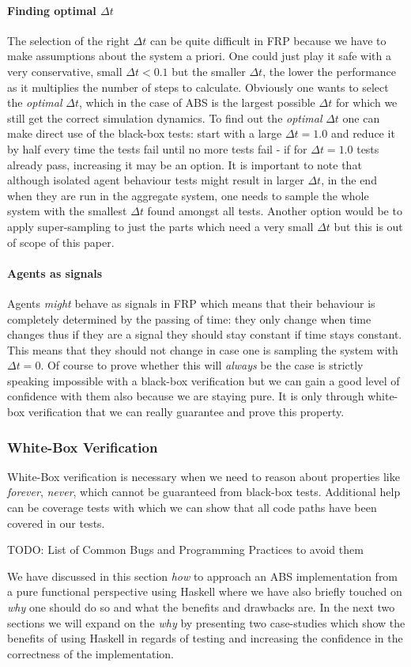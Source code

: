 \paragraph{Finding optimal $\Delta t$}
The selection of the right $\Delta t$ can be quite difficult in FRP because we have to make assumptions about the system a priori. One could just play it safe with a very conservative, small $\Delta t < 0.1$ but the smaller $\Delta t$, the lower the performance as it multiplies the number of steps to calculate. Obviously one wants to select the \textit{optimal} $\Delta t$, which in the case of ABS is the largest possible $\Delta t$ for which we still get the correct simulation dynamics.
To find out the \textit{optimal} $\Delta t$ one can make direct use of the black-box tests: start with a large $\Delta t = 1.0$ and reduce it by half every time the tests fail until no more tests fail - if for $\Delta t = 1.0$ tests already pass, increasing it may be an option. It is important to note that although isolated agent behaviour tests might result in larger $\Delta t$, in the end when they are run in the aggregate system, one needs to sample the whole system with the smallest $\Delta t$ found amongst all tests. Another option would be to apply super-sampling to just the parts which need a very small $\Delta t$ but this is out of scope of this paper.

\paragraph{Agents as signals}
Agents \textit{might} behave as signals in FRP which means that their behaviour is completely determined by the passing of time: they only change when time changes thus if they are a signal they should stay constant if time stays constant. This means that they should not change in case one is sampling the system with $\Delta t = 0$. Of course to prove whether this will \textit{always} be the case is strictly speaking impossible with a black-box verification but we can gain a good level of confidence with them also because we are staying pure. It is only through white-box verification that we can really guarantee and prove this property.

\subsubsection{White-Box Verification}
White-Box verification is necessary when we need to reason about properties like \textit{forever}, \textit{never}, which cannot be guaranteed from black-box tests. Additional help can be coverage tests with which we can show that all code paths have been covered in our tests.

TODO: List of Common Bugs and Programming Practices to avoid them \cite{vipindeep_list_2005}

We have discussed in this section \textit{how} to approach an ABS implementation from a pure functional perspective using Haskell where we have also briefly touched on \textit{why} one should do so and what the benefits and drawbacks are. In the next two sections we will expand on the \textit{why} by presenting two case-studies which show the benefits of using Haskell in regards of testing and increasing the confidence in the correctness of the implementation.